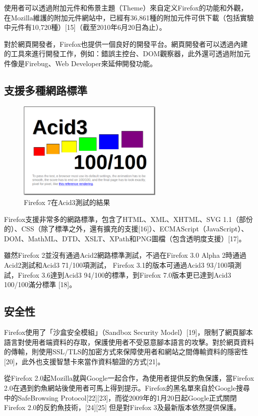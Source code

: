 \documentclass[12pt, a4paper]{article}
\begin{document}
使用者可以透過附加元件和佈景主題（Theme）來自定义Firefox的功能和外觀，在Mozilla維護的附加元件網站中，已經有36,861種的附加元件可供下載（包括實驗中元件有10,720種）[15]（截至2010年6月20日為止）。

對於網頁開發者，Firefox也提供一個良好的開發平台。網頁開發者可以透過內建的工具來進行開發工作，例如：錯誤主控台、DOM觀察器，此外還可透過附加元件像是Firebug、Web Developer來延伸開發功能。

\subsection{支援多種網路標準}

\begin{figure}
\centering
\includegraphics[width=70mm]{Firefox_7_Acid_3_Result}
\caption{Firefox 7在Acid3測試的結果}
\end{figure}

Firefox支援非常多的網路標準，包含了HTML、XML、XHTML、SVG 1.1（部份的）、CSS（除了標準之外，還有擴充的支援[16]）、ECMAScript（JavaScript）、DOM、MathML、DTD、XSLT、XPath和PNG圖檔（包含透明度支援）[17]。

雖然Firefox 2並沒有通過Acid2網路標準測試，不過在Firefox 3.0 Alpha 2時通過Acid2測試和Acid3 71/100項測試， Firefox 3.1的版本可通過Acid3 93/100項測試，Firefox 3.6達到Acid3 94/100的標準，到Firefox 7.0版本更已達到Acid3 100/100滿分標準 [18]。

\subsection{安全性}

Firefox使用了「沙盒安全模組」（Sandbox Security Model）[19]，限制了網頁腳本語言對使用者端資料的存取，保護使用者不受惡意腳本語言的攻擊。對於網頁資料的傳輸，則使用SSL/TLS的加密方式來保障使用者和網站之間傳輸資料的隱密性[20]，此外也支援智慧卡來當作資料驗證的方式[21]。

從Firefox 2.0起Mozilla就與Google一起合作，為使用者提供反釣魚保護，當Firefox 2.0在遇到釣魚網站後使用者可馬上得到提示。Firefox的黑名單來自於Google搜尋中的SafeBrowsing Protocol[22][23]，而從2009年的1月20日起Google正式關閉Firefox 2.0的反釣魚技術，[24][25] 但是對Firefox 3及最新版本依然提供保護。
\end{document}
